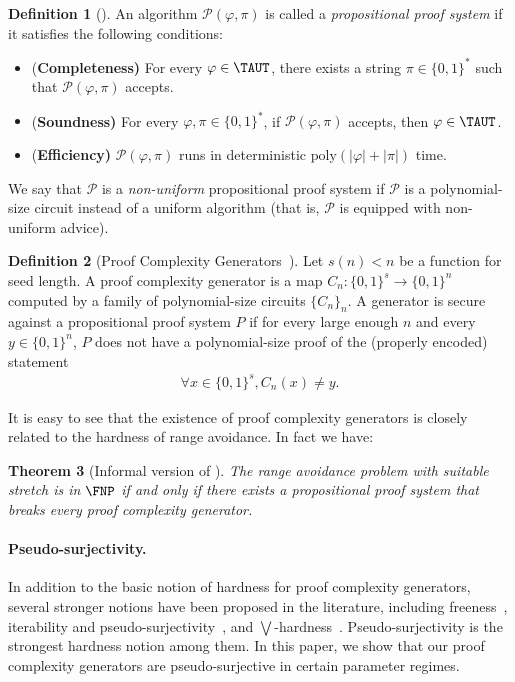 \documentclass[10pt,a4paper]{article}
\newtheorem{theorem}{Theorem}[section]
\theoremstyle{definition}
\newtheorem{definition}[theorem]{Definition}
\theoremstyle{remark}
\renewcommand{\poly}{\mathrm{poly}}
\newcommand{\calP}{\mathcal{P}}
\begin{document}
\begin{definition}[{\cite{CookR79}}]
    An algorithm $\calP(\varphi, \pi)$ is called a \emph{propositional proof system} if it satisfies the following conditions:\begin{itemize}[align=left]
        \item {(\bf Completeness)} For every $\varphi \in \TAUT$, there exists a string $\pi\in\{0, 1\}^*$ such that $\calP(\varphi, \pi)$ accepts.
        \item {(\bf Soundness)} For every $\varphi, \pi \in \{0, 1\}^*$, if $\calP(\varphi, \pi)$ accepts, then $\varphi \in \TAUT$.
        \item {(\bf Efficiency)} $\calP(\varphi, \pi)$ runs in deterministic $\poly(|\varphi| + |\pi|)$ time.
    \end{itemize}
    We say that $\calP$ is a \emph{non-uniform} propositional proof system if $\calP$ is a polynomial-size circuit instead of a uniform algorithm (that is, $\calP$ is equipped with non-uniform advice).
\end{definition}

\begin{definition}[Proof Complexity Generators~\cite{ABRW04,Krajicek04}]
    Let $s(n)<n$ be a function for seed length. A proof complexity generator is a map $C_n:\{0,1\}^s\to \{0,1\}^n$ computed by a family of polynomial-size circuits $\{C_n\}_n$. A generator is secure against a propositional proof system $P$ if for every large enough $n$ and every $y\in\{0,1\}^n$, $P$ does not have a polynomial-size proof of the (properly encoded) statement
    \begin{align*}
        \forall x\in \{0,1\}^s,C_n(x)\neq y.
    \end{align*}
\end{definition}

It is easy to see that the existence of proof complexity generators is closely related to the hardness of range avoidance. In fact we have:

\begin{theorem}[{Informal version of \cite[Theorem 6.6]{RenSW22}}]
    The range avoidance problem with suitable stretch is in $\FNP$ if and only if there exists a propositional proof system that breaks every proof complexity generator.
\end{theorem}


\paragraph{Pseudo-surjectivity.} In addition to the basic notion of hardness for proof complexity generators, several stronger notions have been proposed in the literature, including freeness~\cite{krajivcek2001tautologies}, iterability and pseudo-surjectivity~\cite{Krajicek04}, and $\bigvee$-hardness~\cite{krajivcek2024existence}. Pseudo-surjectivity is the strongest hardness notion among them. In this paper, we show that our proof complexity generators are pseudo-surjective in certain parameter regimes.
\end{document}
